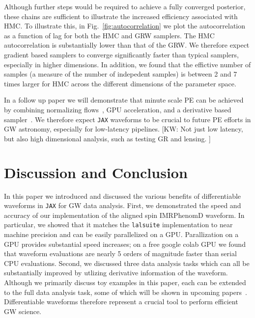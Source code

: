 \documentclass[twocolumn]{aastex631}
\newcommand{\jax}{\texttt{JAX}\xspace}
\newcommand{\lalsuite}{\texttt{lalsuite}\xspace}
\newcommand{\kw}[1]{{\color{rb4}[KW: #1 ]}}
\begin{document}
Although further steps would be required to achieve a fully converged posterior, these chains are sufficient to illustrate the increased efficiency associated with HMC. 
To illustrate this, in Fig.~\ref{fig:autocorrelation} we plot the autocorrelation as a function of lag for both the HMC and GRW samplers.
The HMC autocorrelation is substantially lower than that of the GRW.
We therefore expect gradient based samplers to converge significantly faster than typical samplers, especially in higher dimensions.
In addition, we found that the effictive number of samples (a measure of the number of indepedent samples) is between 2 and 7 times larger for HMC across the different dimensions of the parameter space.

In a follow up paper we will demonstrate that minute scale PE can be achieved by combining normalizing flows~\citep{2022arXiv221106397W, Gabrie:2021tlu}, GPU acceleration, and a derivative based sampler~\citep{PEpaper}. We therefore expect \jax waveforms to be crucial to future PE efforts in GW astronomy, especially for low-latency pipelines. \kw{Not just low latency, but also high dimensional analysis, such as testing GR and lensing.}


\section{Discussion and Conclusion}
\label{subsec:discussion}

In this paper we introduced and discussed the various benefits of differentiable waveforms in \jax for GW data analysis.
First, we demonstrated the speed and accuracy of our implementation of the aligned spin IMRPhenomD waveform.
In particular, we showed that it matches the \lalsuite implementation to near machine precision and can be easily parallelized on a GPU.
Parallization on a GPU provides substantial speed increases; on a free google colab GPU we found that waveform evaluations are nearly 5 orders of magnitude faster than serial CPU evaluations.
Second, we discussed three data analysis tasks which can all be substantially improved by utlizing derivative information of the waveform.
Although we primarily discuss toy examples in this paper, each can be extended to the full data analysis task, some of which will be shown in upcoming papers~\citep{PEpaper}.
Differentiable waveforms therefore represent a crucial tool to perform efficient GW science.
\end{document}
